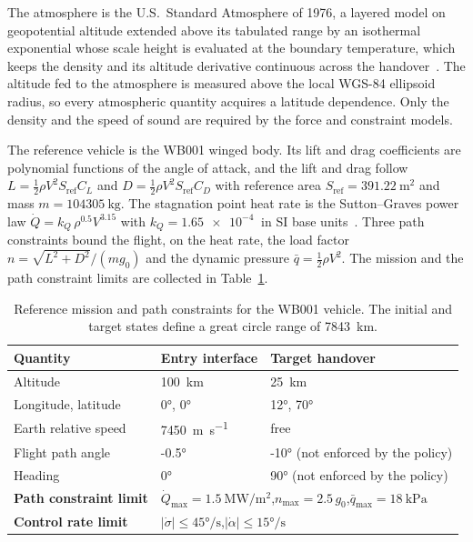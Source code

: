 \documentclass[11pt]{article}
\begin{document}
The atmosphere is the U.S.\ Standard Atmosphere of 1976, a layered model on geopotential altitude extended above its tabulated range by an isothermal exponential whose scale height is evaluated at the boundary temperature, which keeps the density and its altitude derivative continuous across the handover~\cite{ussa1976}. The altitude fed to the atmosphere is measured above the local WGS-84 ellipsoid radius, so every atmospheric quantity acquires a latitude dependence. Only the density and the speed of sound are required by the force and constraint models.

The reference vehicle is the WB001 winged body. Its lift and drag coefficients are polynomial functions of the angle of attack, and the lift and drag follow $L=\tfrac12\rho V^2 S_{\mathrm{ref}}C_L$ and $D=\tfrac12\rho V^2 S_{\mathrm{ref}}C_D$ with reference area $S_{\mathrm{ref}}=\SI{391.22}{\meter\squared}$ and mass $m=\SI{104305}{\kilo\gram}$. The stagnation point heat rate is the Sutton--Graves power law $\dot Q=k_Q\,\rho^{0.5}V^{3.15}$ with $k_Q=\SI{1.65e-4}{}$ in SI base units~\cite{suttongraves1971}. Three path constraints bound the flight, on the heat rate, the load factor $n=\sqrt{L^2+D^2}/(mg_0)$ and the dynamic pressure $\bar q=\tfrac12\rho V^2$. The mission and the path constraint limits are collected in Table~\ref{tab:mission}.

\begin{table}[t]
\centering
\caption{Reference mission and path constraints for the WB001 vehicle. The initial and target states define a great circle range of \SI{7843}{\kilo\meter}.}
\label{tab:mission}
\begin{tabular}{@{}lll@{}}
\toprule
\textbf{Quantity} & \textbf{Entry interface} & \textbf{Target handover} \\
\midrule
Altitude              & \SI{100}{\kilo\meter} & \SI{25}{\kilo\meter} \\
Longitude, latitude   & \ang{0}, \ang{0}      & \ang{12}, \ang{70} \\
Earth relative speed  & \SI{7450}{\meter\per\second} & free \\
Flight path angle     & \ang{-0.5}            & \ang{-10} (not enforced by the policy) \\
Heading               & \ang{0}               & \ang{90} (not enforced by the policy) \\
\midrule
\textbf{Path constraint limit} & \multicolumn{2}{l}{$\dot Q_{\max}=\SI{1.5}{\mega\watt\per\meter\squared}$,\quad $n_{\max}=2.5\,g_0$,\quad $\bar q_{\max}=\SI{18}{\kilo\pascal}$} \\
\textbf{Control rate limit} & \multicolumn{2}{l}{$|\dot\sigma|\le\ang{45}/\text{s}$,\quad $|\dot\alpha|\le\ang{15}/\text{s}$} \\
\bottomrule
\end{tabular}
\end{table}
\end{document}
